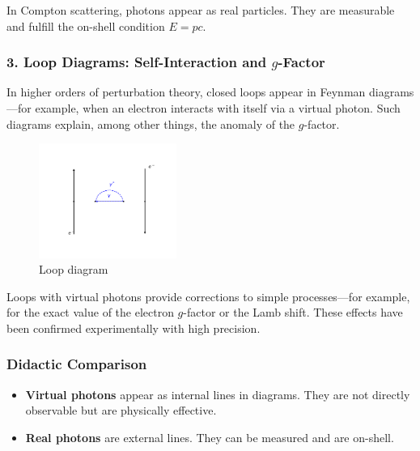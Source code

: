 \begin{tcolorbox}[physikbox, title=Real Photons]
	\label{box:Reale Photonen}
	In Compton scattering, photons appear as real particles. They are measurable and fulfill the on-shell condition $E = pc$.
\end{tcolorbox}
\newpage
\noindent
\subsubsection*{3. Loop Diagrams: Self-Interaction and $g$-Factor}
In higher orders of perturbation theory, closed loops appear in Feynman diagrams—for example, when an electron interacts with itself via a virtual photon. Such diagrams explain, among other things, the anomaly of the $g$-factor.
\begin{figure}[H]
	\begin{center}
		\includegraphics[width=0.4\textwidth]{bilder/vertex-korrektur.pdf}
	\end{center}
	\caption{Loop diagram}
\end{figure}

\begin{tcolorbox}[hinweisbox, title=Loop Diagrams and Precision Effects]
	\label{box:Schleifendiagramme}
	Loops with virtual photons provide corrections to simple processes—for example, for the exact value of the electron $g$-factor or the Lamb shift. These effects have been confirmed experimentally with high precision.
\end{tcolorbox}

\subsubsection*{Didactic Comparison}
\begin{itemize}
	\item \textbf{Virtual photons} appear as internal lines in diagrams. They are not directly observable but are physically effective.
	\item \textbf{Real photons} are external lines. They can be measured and are on-shell.
\end{itemize}

